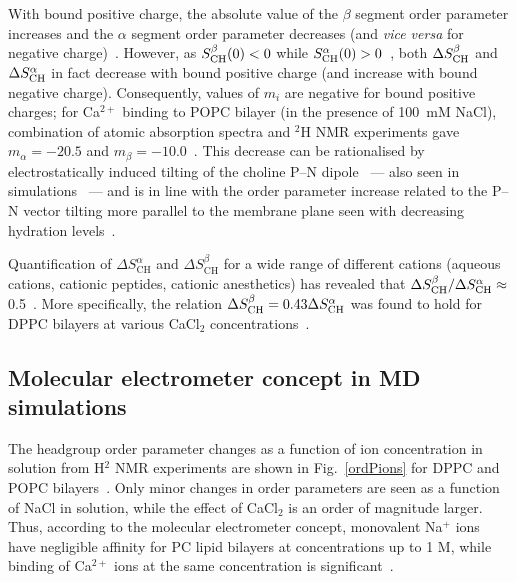 \documentclass[twoside,twocolumn,9pt]{article}
\begin{document}
With bound positive charge, the absolute value of the $\beta$ segment order parameter increases
and the $\alpha$ segment order parameter decreases 
(and {\it vice versa} for negative charge)~\cite{brown77,akutsu81,altenbach84,altenbach85,seelig87,scherer89,rydall92}. 
However, as $S_{\rm{CH}}^{\beta}(0)<0$ while $S_{\rm{CH}}^{\alpha}(0)>0$~\cite{hong95a,hong95b,gross97}, %
both $\Delta S_{\rm{CH}}^{\beta}$ and $\Delta S_{\rm{CH}}^{\alpha}$ in fact decrease with bound positive charge 
(and increase with bound negative charge). Consequently, values of $m_i$ are negative for
bound positive charges; %
for Ca$^{2+}$ binding to POPC bilayer (in the presence of 100~mM NaCl),
combination of atomic absorption spectra and $^2$H NMR experiments gave
$m_\alpha=-20.5$  and $m_\beta=-10.0$~\cite{altenbach84}.
This decrease can be rationalised by electrostatically 
induced tilting of the choline P--N dipole~\cite{seelig87,scherer89,seelig90} --- also
seen in simulations~\cite{gurtovenko05,cordomi08,cordomi09,zhao12} ---
and is in line with the order parameter increase related to the P--N vector tilting more parallel to the membrane plane seen with decreasing hydration levels~\cite{botan15}. 


Quantification of $\Delta S_\mathrm{CH}^\alpha$ and $\Delta S_\mathrm{CH}^\beta$
for a wide range of different cations (aqueous cations, cationic peptides, cationic anesthetics)
has revealed that $\Delta S_{\rm{CH}}^{\beta}/\Delta S_{\rm{CH}}^{\alpha} \approx$\,0.5~\cite{beschiasvili91,rydall92}.
More specifically,
the relation $\Delta S_{\rm{CH}}^{\beta}=0.43 \Delta S_{\rm{CH}}^{\alpha}$ was found to hold for DPPC bilayers
at various CaCl$_2$ concentrations~\cite{akutsu81}.


\subsection{Molecular electrometer concept in MD simulations}\label{electrometerinsimulations}

The headgroup order parameter changes as a function of ion concentration in
solution from H$^2$ NMR experiments are shown in Fig.~\ref{ordPions} for DPPC and POPC bilayers~\cite{akutsu81,altenbach84}.
Only minor changes in order parameters are seen
as a function of NaCl in solution, 
while the effect of CaCl$_2$ is an order of magnitude larger. 
Thus, according to the molecular electrometer concept, 
monovalent Na$^+$ ions have negligible affinity for PC lipid bilayers at concentrations up to 1 M,
while binding of Ca$^{2+}$ ions at the same concentration is significant~\cite{akutsu81,altenbach84}. 
\end{document}
